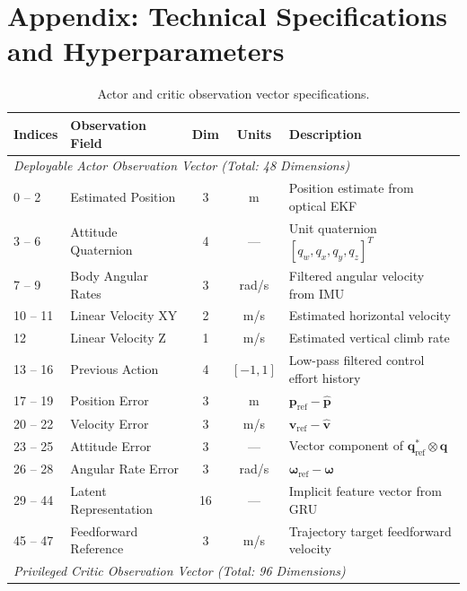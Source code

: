\documentclass[11pt,a4paper]{article}
\begin{document}
\newpage
\appendix
\section*{Appendix: Technical Specifications and Hyperparameters}
\label{sec:appendix}

\begin{table}[h!]
  \centering
  \small
  \caption{Actor and critic observation vector specifications.}
  \label{tab:obs_spec}
  \begin{tabularx}{\textwidth}{lp{4.2cm}ccX}
    \toprule
    Indices & Observation Field & Dim & Units & Description \\
    \midrule
    \multicolumn{5}{l}{\textit{Deployable Actor Observation Vector (Total: 48 Dimensions)}} \\
    0 -- 2 & Estimated Position & 3 & m & Position estimate from optical EKF \\
    3 -- 6 & Attitude Quaternion & 4 & --- & Unit quaternion $[q_w, q_x, q_y, q_z]^T$ \\
    7 -- 9 & Body Angular Rates & 3 & rad/s & Filtered angular velocity from IMU \\
    10 -- 11 & Linear Velocity XY & 2 & m/s & Estimated horizontal velocity \\
    12 & Linear Velocity Z & 1 & m/s & Estimated vertical climb rate \\
    13 -- 16 & Previous Action & 4 & $[-1, 1]$ & Low-pass filtered control effort history \\
    17 -- 19 & Position Error & 3 & m & $\mathbf{p}_{\text{ref}} - \hat{\mathbf{p}}$ \\
    20 -- 22 & Velocity Error & 3 & m/s & $\mathbf{v}_{\text{ref}} - \hat{\mathbf{v}}$ \\
    23 -- 25 & Attitude Error & 3 & --- & Vector component of $\mathbf{q}_{\text{ref}}^* \otimes \mathbf{q}$ \\
    26 -- 28 & Angular Rate Error & 3 & rad/s & $\boldsymbol{\omega}_{\text{ref}} - \boldsymbol{\omega}$ \\
    29 -- 44 & Latent Representation & 16 & --- & Implicit feature vector from GRU \\
    45 -- 47 & Feedforward Reference & 3 & m/s & Trajectory target feedforward velocity \\
    \midrule
    \multicolumn{5}{l}{\textit{Privileged Critic Observation Vector (Total: 96 Dimensions)}} \\

\end{tabularx}
\end{table}
\end{document}
